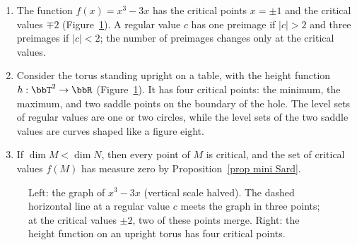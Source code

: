 \begin{example}\label{example critical values}
    \begin{enumerate}
        \item The function $f(x)=x^3-3x$ has the critical points $x=\pm1$ and the critical values $\mp2$ (Figure~\ref{fig critical values}). A regular value $c$ has one preimage if $\lvert c\rvert>2$ and three preimages if $\lvert c\rvert<2$; the number of preimages changes only at the critical values.
        \item Consider the torus standing upright on a table, with the height function $h:\bbT^2\to\bbR$ (Figure~\ref{fig critical values}). It has four critical points: the minimum, the maximum, and two saddle points on the boundary of the hole. The level sets of regular values are one or two circles, while the level sets of the two saddle values are curves shaped like a figure eight.
        \item If $\dim M<\dim N$, then every point of $M$ is critical, and the set of critical values $f(M)$ has measure zero by Proposition~\ref{prop mini Sard}.
    \end{enumerate}
\end{example}

\begin{figure}[tp]
    \centering
    \caption{Left: the graph of $x^3-3x$ (vertical scale halved). The dashed horizontal line at a regular value $c$ meets the graph in three points; at the critical values $\pm2$, two of these points merge. Right: the height function on an upright torus has four critical points.}
    \label{fig critical values}
\end{figure}

